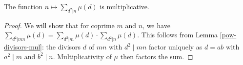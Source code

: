\begin{theorem}
\label{sum_moebius_sq_divisors_IsMultiplicative}
\leanok
The function $n \mapsto \sum_{d^2|n} \mu(d)$ is multiplicative.
\end{theorem}
\begin{proof}
\leanok
We will show that for coprime $m$ and $n$, we have
    $\sum_{d^2|mn} \mu(d) = \sum_{d^2|m} \mu(d) \cdot \sum_{d^2|n} \mu(d)$. This follows from
    Lemma \ref{pow-divisors-mul}: the divisors $d$ of $mn$ with $d^2 \mid mn$ factor uniquely as
    $d=ab$ with $a^2 \mid m$ and $b^2 \mid n$. Multiplicativity of $\mu$ then factors the sum.
\end{proof}
